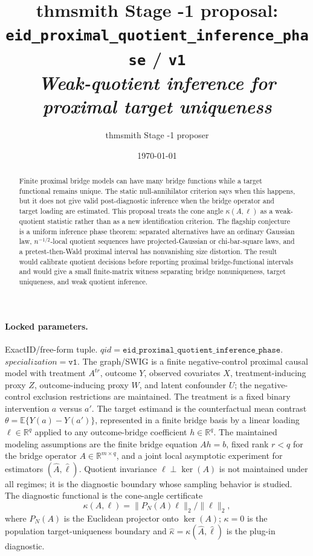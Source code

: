 \documentclass[11pt]{article}
\title{thmsmith Stage -1 proposal: \texttt{eid\_proximal\_quotient\_inference\_phase} / \texttt{v1}%
  \\ \large\textit{Weak-quotient inference for proximal target uniqueness}}
\author{thmsmith Stage -1 proposer}
\date{\today}
\newcommand{\E}{\mathbb{E}}
\newcommand{\R}{\mathbb{R}}
\theoremstyle{definition}
\theoremstyle{plain}
\theoremstyle{remark}
\begin{document}
\maketitle


\paragraph{Locked parameters.}
ExactID/free-form tuple. \(qid=\texttt{eid\_proximal\_quotient\_inference\_phase}\). \(specialization=\texttt{v1}\). The graph/SWIG is a finite negative-control proximal causal model with treatment \(A^{tr}\), outcome \(Y\), observed covariates \(X\), treatment-inducing proxy \(Z\), outcome-inducing proxy \(W\), and latent confounder \(U\); the negative-control exclusion restrictions are maintained. The treatment is a fixed binary intervention \(a\) versus \(a'\). The target estimand is the counterfactual mean contrast \(\theta=\E\{Y(a)-Y(a')\}\), represented in a finite bridge basis by a linear loading \(\ell\in\R^q\) applied to any outcome-bridge coefficient \(h\in\R^q\). The maintained modeling assumptions are the finite bridge equation \(Ah=b\), fixed rank \(r<q\) for the bridge operator \(A\in\R^{m\times q}\), and a joint local asymptotic experiment for estimators \((\widehat A,\widehat \ell)\). Quotient invariance \(\ell\perp\ker(A)\) is not maintained under all regimes; it is the diagnostic boundary whose sampling behavior is studied. The diagnostic functional is the cone-angle certificate
\[
        \kappa(A,\ell)=\|P_N(A)\ell\|_2/\|\ell\|_2,
\]
where \(P_N(A)\) is the Euclidean projector onto \(\ker(A)\); \(\kappa=0\) is the population target-uniqueness boundary and \(\widehat\kappa=\kappa(\widehat A,\widehat\ell)\) is the plug-in diagnostic.

\begin{abstract}
Finite proximal bridge models can have many bridge functions while a target functional remains unique. The static null-annihilator criterion says when this happens, but it does not give valid post-diagnostic inference when the bridge operator and target loading are estimated. This proposal treats the cone angle \(\kappa(A,\ell)\) as a weak-quotient statistic rather than as a new identification criterion. The flagship conjecture is a uniform inference phase theorem: separated alternatives have an ordinary Gaussian law, \(n^{-1/2}\)-local quotient sequences have projected-Gaussian or chi-bar-square laws, and a pretest-then-Wald proximal interval has nonvanishing size distortion. The result would calibrate quotient decisions before reporting proximal bridge-functional intervals and would give a small finite-matrix witness separating bridge nonuniqueness, target uniqueness, and weak quotient inference.
\end{abstract}
\end{document}
